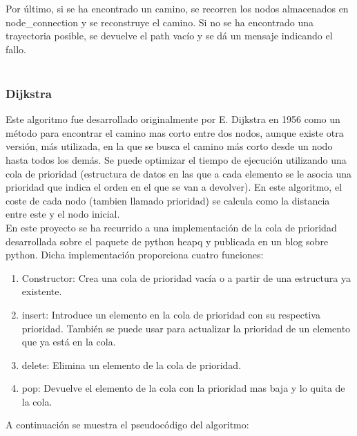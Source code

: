 Por último, si se ha encontrado un camino, se recorren los nodos almacenados en node\_connection y se reconstruye el camino. Si no se ha encontrado una trayectoria posible, se devuelve el path vacío y se dá un mensaje indicando el fallo.\\
\\

\subsubsection{Dijkstra}

Este algoritmo fue desarrollado originalmente por E. Dijkstra en 1956 como un método para encontrar el camino mas corto entre dos nodos, aunque existe otra versión, más utilizada, en la que se busca el camino más corto desde un nodo hasta todos los demás. Se puede optimizar el tiempo de ejecución utilizando una cola de prioridad (estructura de datos en las que a cada elemento se le asocia una prioridad que indica el orden en el que se van a devolver). En este algoritmo, el coste de cada nodo (tambien llamado prioridad) se calcula como la distancia entre este y el nodo inicial.\\ 

En este proyecto se ha recurrido a una implementación de la cola de prioridad desarrollada sobre el paquete de python heapq y publicada en un blog sobre python. Dicha implementación  proporciona cuatro funciones:\\

\begin{enumerate}
\item Constructor: Crea una cola de prioridad vacía o a partir de una estructura ya existente.
\item insert: Introduce un elemento en la cola de prioridad con su respectiva prioridad. También se puede usar para actualizar la prioridad de un elemento que ya está en la cola.
\item delete: Elimina un elemento de la cola de prioridad.
\item pop: Devuelve el elemento de la cola con la prioridad mas baja y lo quita de la cola. 
\end{enumerate}

A continuación se muestra el pseudocódigo del algoritmo:\\

